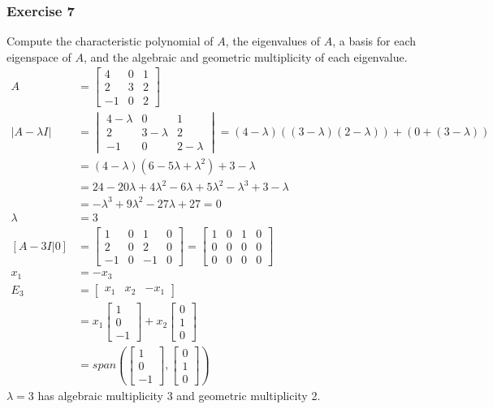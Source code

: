 \documentclass{math}
\begin{document}
\subsubsection*{Exercise 7}
Compute the characteristic polynomial of \( A \), the eigenvalues of \( A \),
a basis for each eigenspace of \( A \), and the algebraic and geometric
multiplicity of each eigenvalue.
\begin{align*}
  A &= \begin{bmatrix}
    4 & 0 & 1 \\
    2 & 3 & 2 \\
    -1 & 0 & 2
  \end{bmatrix} \\
  |A-\lambda I| &= \begin{vmatrix}
    4-\lambda & 0 & 1 \\
    2 & 3-\lambda & 2 \\
    -1 & 0 & 2-\lambda
  \end{vmatrix} = (4-\lambda)((3-\lambda)(2-\lambda))+(0+(3-\lambda)) \\
  &= (4-\lambda)(6-5\lambda+\lambda^2)+3-\lambda \\
  &= 24-20\lambda+4\lambda^2-6\lambda+5\lambda^2-\lambda^3+3-\lambda \\
  &= -\lambda^3+9\lambda^2-27\lambda+27 = 0 \\
  \lambda &= 3 \\
  [A-3I|0] &= \begin{bmatrix}
    1 & 0 & 1 & 0 \\
    2 & 0 & 2 & 0 \\
    -1 & 0 & -1 & 0
  \end{bmatrix} = \begin{bmatrix}
    1 & 0 & 1 & 0 \\
    0 & 0 & 0 & 0 \\
    0 & 0 & 0 & 0
  \end{bmatrix} \\
  x_1 &= -x_3 \\
  E_3 &= \begin{bmatrix}x_1 & x_2 & -x_1\end{bmatrix} \\
  &= x_1\begin{bmatrix}1 \\ 0 \\ -1\end{bmatrix}+
    x_2\begin{bmatrix}0 \\ 1 \\ 0\end{bmatrix} \\
  &= span\left(\begin{bmatrix}1 \\ 0 \\ -1\end{bmatrix},
    \begin{bmatrix}0 \\ 1 \\ 0\end{bmatrix}\right)
\end{align*}
\( \lambda = 3 \) has algebraic multiplicity 3 and geometric multiplicity 2.
\end{document}

